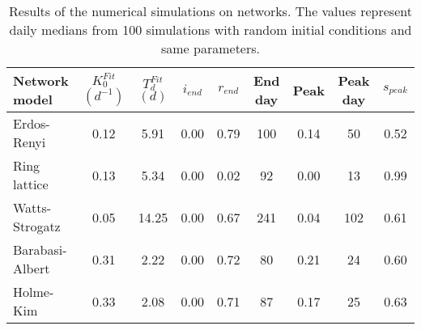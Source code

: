 \begin{table}[h!]
\centering
\caption{Results of the numerical simulations on networks. The values represent daily medians from 100 simulations with random initial conditions and same parameters.}
\label{tab:results}
\begin{tabular}{lcccccccc}
\toprule
   Network model & $K_0^{Fit}$ $(d^{-1})$ & $T_d^{Fit}$ $(d)$ & $i_{end}$ & $r_{end}$ & End day & Peak  & Peak day & $s_{peak}$\\
\midrule
 Erdos-Renyi 			&    0.12 &   5.91 &  0.00 &  0.79 &    100 &  0.14 &   50 & 0.52 \\
 Ring lattice 		&    0.13 &   5.34 &  0.00 &  0.02 &  	 92 &  0.00 &   13 & 0.99 \\
 Watts-Strogatz 	&    0.05 &  14.25 &  0.00 &  0.67 &    241 &  0.04 &  102 & 0.61 \\
 Barabasi-Albert 	&    0.31 &   2.22 &  0.00 &  0.72 &  	 80 &  0.21 &   24 & 0.60 \\
 Holme-Kim 				&    0.33 &   2.08 &  0.00 &  0.71 &  	 87 &  0.17 &   25 & 0.63 \\

 
\bottomrule
\end{tabular}
\end{table}
